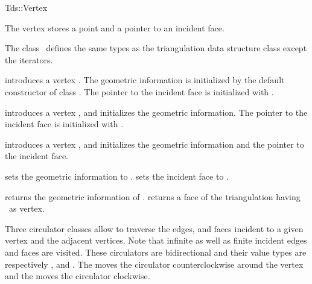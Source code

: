 \begin{ccClass}{Tds::Vertex}

\ccThreeToTwo

The vertex stores a point and a pointer to an incident face.

\ccInheritsFrom {}

\ccTypes
The class \ccClassName\
defines the same types as the triangulation data structure class 
except the iterators.
\begin{ccAdvanced}

\ccCreation

{introduces a vertex \ccVar. The geometric information is
 initialized by the default constructor of class .
The pointer to the incident face is initialized with .}

{introduces a vertex \ccVar, and initializes the geometric information.
The pointer to the incident face is initialized with \ccc{NULL}.}

{introduces a vertex \ccVar, and initializes the geometric information and 
the pointer to the incident face.}
\end{ccAdvanced}


\begin{ccAdvanced}

{sets the geometric information to .}
\ccGlue
{}
{sets the incident face to .}


\end{ccAdvanced}



{returns  the geometric information of \ccVar.}
\ccGlue
{}
{returns a face of the triangulation having  \ccVar\ as vertex.}

Three circulator classes allow to traverse the edges, and faces
incident to a given vertex and the adjacent vertices.
Note that infinite as well as finite incident edges and faces are visited.
 These circulators are bidirectional
and their value types are respectively , 
and .
The   moves the circulator
counterclockwise around the vertex 
and  the  moves the circulator
clockwise. 


\end{ccClass}
